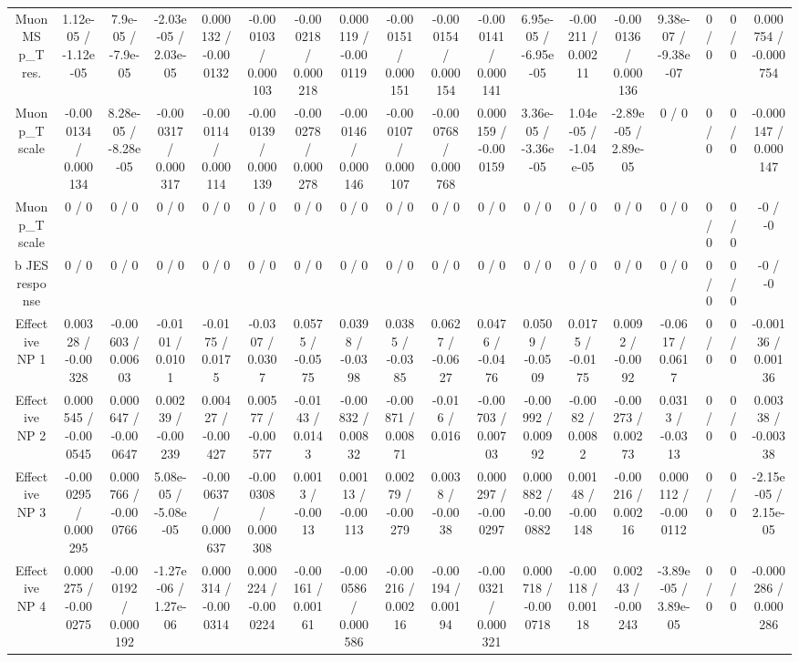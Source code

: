 \documentclass[10pt]{article}
\begin{document}
\begin{table}[htbp]
\begin{center}
\begin{tabular}{|c|c|c|c|c|c|c|c|c|c|c|c|c|c|c|c|c|c|}
  Muon MS p_{T} res. & 1.12e-05 / -1.12e-05 & 7.9e-05 / -7.9e-05 & -2.03e-05 / 2.03e-05 & 0.000132 / -0.000132 & -0.000103 / 0.000103 & -0.000218 / 0.000218 & 0.000119 / -0.000119 & -0.000151 / 0.000151 & -0.000154 / 0.000154 & -0.000141 / 0.000141 & 6.95e-05 / -6.95e-05 & -0.00211 / 0.00211 & -0.000136 / 0.000136 & 9.38e-07 / -9.38e-07 & 0 / 0 & 0 / 0 & 0.000754 / -0.000754 \\ 
  Muon p_{T} scale & -0.000134 / 0.000134 & 8.28e-05 / -8.28e-05 & -0.000317 / 0.000317 & -0.000114 / 0.000114 & -0.000139 / 0.000139 & -0.000278 / 0.000278 & -0.000146 / 0.000146 & -0.000107 / 0.000107 & -0.000768 / 0.000768 & 0.000159 / -0.000159 & 3.36e-05 / -3.36e-05 & 1.04e-05 / -1.04e-05 & -2.89e-05 / 2.89e-05 & 0 / 0 & 0 / 0 & 0 / 0 & -0.000147 / 0.000147 \\ 
  Muon p_{T} scale & 0 / 0 & 0 / 0 & 0 / 0 & 0 / 0 & 0 / 0 & 0 / 0 & 0 / 0 & 0 / 0 & 0 / 0 & 0 / 0 & 0 / 0 & 0 / 0 & 0 / 0 & 0 / 0 & 0 / 0 & 0 / 0 & -0 / -0 \\ 
  b JES response & 0 / 0 & 0 / 0 & 0 / 0 & 0 / 0 & 0 / 0 & 0 / 0 & 0 / 0 & 0 / 0 & 0 / 0 & 0 / 0 & 0 / 0 & 0 / 0 & 0 / 0 & 0 / 0 & 0 / 0 & 0 / 0 & -0 / -0 \\ 
  Effective NP 1 & 0.00328 / -0.00328 & -0.00603 / 0.00603 & -0.0101 / 0.0101 & -0.0175 / 0.0175 & -0.0307 / 0.0307 & 0.0575 / -0.0575 & 0.0398 / -0.0398 & 0.0385 / -0.0385 & 0.0627 / -0.0627 & 0.0476 / -0.0476 & 0.0509 / -0.0509 & 0.0175 / -0.0175 & 0.0092 / -0.0092 & -0.0617 / 0.0617 & 0 / 0 & 0 / 0 & -0.00136 / 0.00136 \\ 
  Effective NP 2 & 0.000545 / -0.000545 & 0.000647 / -0.000647 & 0.00239 / -0.00239 & 0.00427 / -0.00427 & 0.00577 / -0.00577 & -0.0143 / 0.0143 & -0.00832 / 0.00832 & -0.00871 / 0.00871 & -0.016 / 0.016 & -0.00703 / 0.00703 & -0.00992 / 0.00992 & -0.0082 / 0.0082 & -0.00273 / 0.00273 & 0.0313 / -0.0313 & 0 / 0 & 0 / 0 & 0.00338 / -0.00338 \\ 
  Effective NP 3 & -0.000295 / 0.000295 & 0.000766 / -0.000766 & 5.08e-05 / -5.08e-05 & -0.000637 / 0.000637 & -0.000308 / 0.000308 & 0.0013 / -0.0013 & 0.00113 / -0.00113 & 0.00279 / -0.00279 & 0.0038 / -0.0038 & 0.000297 / -0.000297 & 0.000882 / -0.000882 & 0.00148 / -0.00148 & -0.00216 / 0.00216 & 0.000112 / -0.000112 & 0 / 0 & 0 / 0 & -2.15e-05 / 2.15e-05 \\ 
  Effective NP 4 & 0.000275 / -0.000275 & -0.000192 / 0.000192 & -1.27e-06 / 1.27e-06 & 0.000314 / -0.000314 & 0.000224 / -0.000224 & -0.00161 / 0.00161 & -0.000586 / 0.000586 & -0.00216 / 0.00216 & -0.00194 / 0.00194 & -0.000321 / 0.000321 & 0.000718 / -0.000718 & -0.00118 / 0.00118 & 0.00243 / -0.00243 & -3.89e-05 / 3.89e-05 & 0 / 0 & 0 / 0 & -0.000286 / 0.000286 \\ 

\end{tabular}
\end{center}
\end{table}
\end{document}

